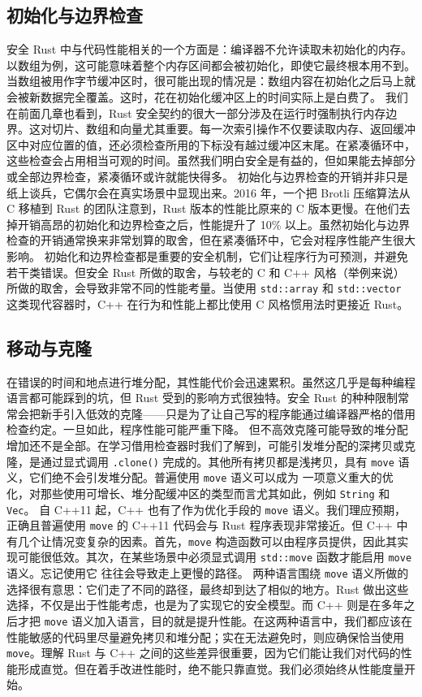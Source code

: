 \subsection{初始化与边界检查}
\label{idx:idx_395ec22e}
安全 Rust 中与代码性能相关的一个方面是：编译器不允许读取未初始化的内存。以数组为例，这可能意味着整个内存区间都会被初始化，即使它最终根本用不到。当数组被用作字节缓冲区时，很可能出现的情况是：数组内容在初始化之后马上就会被新数据完全覆盖。这时，花在初始化缓冲区上的时间实际上是白费了。
我们在前面几章也看到，Rust 安全契约的很大一部分涉及在运行时强制执行内存边界。这对切片、数组和向量尤其重要。每一次索引操作不仅要读取内存、返回缓冲区中对应位置的值，还必须检查所用的下标没有越过缓冲区末尾。在紧凑循环中，这些检查会占用相当可观的时间。虽然我们明白安全是有益的，但如果能去掉部分或全部边界检查，紧凑循环或许就能快得多。
初始化与边界检查的开销并非只是纸上谈兵，它偶尔会在真实场景中显现出来。2016 年，一个把 Brotli 压缩算法从 C 移植到 Rust 的团队注意到，Rust 版本的性能比原来的 C 版本更慢。在他们去掉开销高昂的初始化和边界检查之后，性能提升了 10\% 以上。虽然初始化与边界检查的开销通常换来非常划算的取舍，但在紧凑循环中，它会对程序性能产生很大影响。
初始化和边界检查都是重要的安全机制，它们让程序行为可预测，并避免若干类错误。但安全 Rust 所做的取舍，与较老的 C 和 C++ 风格（举例来说）所做的取舍，会导致非常不同的性能考量。当使用 \texttt{std::array} 和 \texttt{std::vector} 这类现代容器时，C++ 在行为和性能上都比使用 C 风格惯用法时更接近 Rust。
\subsection{移动与克隆}
\label{idx:idx_3ee089fe}
在错误的时间和地点进行堆分配，其性能代价会迅速累积。虽然这几乎是每种编程语言都可能踩到的坑，但 Rust 受到的影响方式很独特。安全 Rust 的种种限制常常会把新手引入低效的克隆——只是为了让自己写的程序能通过编译器严格的借用检查约定。一旦如此，程序性能可能严重下降。
但不高效克隆可能导致的堆分配增加还不是全部。在学习借用检查器时我们了解到，可能引发堆分配的深拷贝或克隆，是通过显式调用 \texttt{.clone()} 完成的。其他所有拷贝都是浅拷贝，具有
\texttt{move} 语义，它们绝不会引发堆分配。普遍使用 \texttt{move} 语义可以成为
一项意义重大的优化，对那些使用可增长、堆分配缓冲区的类型而言尤其如此，例如
\texttt{String} 和 \texttt{Vec}。
自 C++11 起，C++ 也有了作为优化手段的 \texttt{move} 语义。我们理应预期，正确且普遍使用 \texttt{move} 的 C++11 代码会与 Rust 程序表现非常接近。但 C++ 中有几个让情况变复杂的因素。首先，\texttt{move} 构造函数可以由程序员提供，因此其实现可能很低效。其次，在某些场景中必须显式调用
\texttt{std::move} 函数才能启用 \texttt{move} 语义。忘记使用它
往往会导致走上更慢的路径。
\label{idx:idx_c5ebd064}
两种语言围绕 \texttt{move} 语义所做的选择很有意思：它们走了不同的路径，最终却到达了相似的地方。Rust 做出这些选择，不仅是出于性能考虑，也是为了实现它的安全模型。而 C++ 则是在多年之后才把 \texttt{move} 语义加入语言，目的就是提升性能。在这两种语言中，我们都应该在性能敏感的代码里尽量避免拷贝和堆分配；实在无法避免时，则应确保恰当使用 \texttt{move}。理解 Rust 与 C++ 之间的这些差异很重要，因为它们能让我们对代码的性能形成直觉。但在着手改进性能时，绝不能只靠直觉。我们必须始终从性能度量开始。

